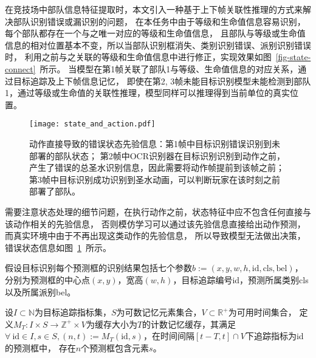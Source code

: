 在竞技场中部队信息特征提取时，本文引入一种基于上下帧关联性推理的方式来解决部队识别错误或漏识别的问题，
在本任务中由于等级和生命值信息容易识别，每个部队都存在一个与之唯一对应的等级和生命值信息，
且部队与等级或生命值信息的相对位置基本不变，所以当部队识别框消失、类别识别错误、派别识别错误时，
利用之前与之关联的等级和生命值信息中进行修正，实现效果如图~\ref{fig-state-connect}~所示。
当模型在第1帧关联了部队1与等级、生命值信息的对应关系，通过目标追踪及上下帧信息记忆，
即使在第2, 3帧未能目标识别模型未能检测到部队1，通过等级或生命值的关联性推理，模型同样可以推理得到当前单位的真实位置。
\begin{figure}[htbp]
  \centering\vspace{-1ex}
  \texttt{[image: state\_and\_action.pdf]}
  \vspace{4ex}
  \caption{动作直接导致的错误状态先验信息：第1帧中目标识别错误识别到未部署的部队状态；
  第2帧中OCR识别器在目标识别识别到动作之前，产生了错误的总圣水识别信息，因此需要将动作帧提前到该帧之前；
  第3帧中目标识别成功识别到圣水动画，可以判断玩家在该时刻之前部署了部队。}
  \label{fig-state-action}
\end{figure}

需要注意状态处理的细节问题，在执行动作之前，状态特征中应不包含任何直接与该动作相关的先验信息，
否则模仿学习可以通过该先验信息直接给出动作预测，而真实环境中由于不再出现这类动作的先验信息，
所以导致模型无法做出决策，错误状态信息如图~\ref{fig-state-action}~所示。

假设目标识别每个预测框的识别结果包括七个参数$b:=(x,y,w,h,\text{id},\text{cls},\text{bel})$，
分别为预测框的中心点$(x,y)$，宽高$(w,h)$，目标追踪编号id，预测所属类别cls以及所属派别bel。

\begin{definition}[计数记忆缓存]
  设$I\subset \mathbb{N}$为目标追踪指标集，$S$为可数记忆元素集合，$V\subset \mathbb{R}^+$为可用时间集合，
  定义$M_{T}:I\times S\to\mathbb{Z}^+\times V$为缓存大小为$T$的计数记忆缓存，其满足
  $\forall~ \text{id}\in I, s\in S, (n,t):=M_T(\text{id},s)$，在时间间隔$[t-T,t]\cap V$下追踪指标为id的预测框中，
  存在$n$个预测框包含元素$s$。
\end{definition}


